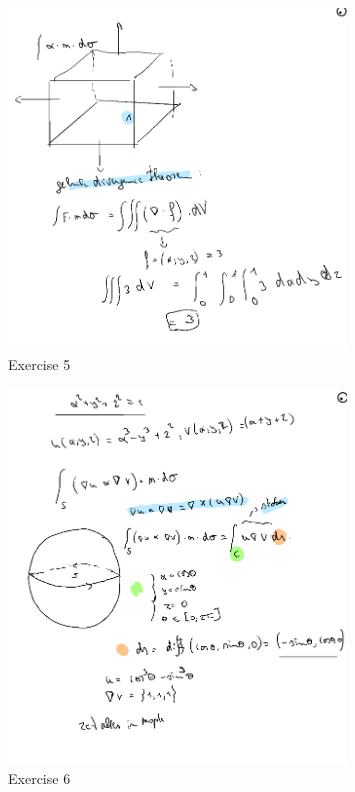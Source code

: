 \documentclass[a4paper]{report}
\begin{document}
\begin{figure}[H]
	\centering
	\includegraphics[width=0.8\textwidth]{assets/huis_7_ex_5.png}
	\caption{Exercise 5}
	\label{fig:huis_7_ex_5}
\end{figure}

\begin{figure}[H]
	\centering
	\includegraphics[width=0.8\textwidth]{assets/huis_7_ex_6.png}
	\caption{Exercise 6}
	\label{fig:huis_7_ex_6}
\end{figure}
\end{document}
